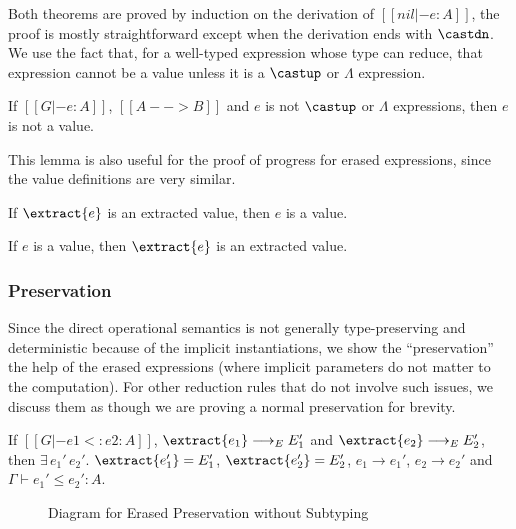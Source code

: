\noindent Both theorems are proved by induction on the derivation of $[[nil |- e : A]]$,
the proof is mostly straightforward except when the derivation ends with $\castdn$.
We use the fact that, for a well-typed expression whose type can reduce, that expression
cannot be a value unless it is a $\castup$ or $\Lambda$ expression.

\begin{lemma}
    If $[[G |- e : A]]$, $[[A --> B]]$ and $e$ is not $\castup$ or $\Lambda$ expressions,
    then $e$ is not a value.
\end{lemma}

This lemma is also useful for the proof of progress for erased expressions, since the
value definitions are very similar.

\begin{lemma}
    If $\extract{e}$ is an extracted value, then $e$ is a value.
\end{lemma}

\begin{lemma}
    If $e$ is a value, then $\extract{e}$ is an extracted value.
\end{lemma}


\subsubsection{Preservation}

Since the direct operational semantics is not generally type-preserving and
deterministic because of the implicit instantiations, we show the
``preservation'' the help of the erased expressions (where implicit parameters
do not matter to the computation). For other reduction rules that do not involve
such issues, we discuss them as though we are proving a normal preservation
for brevity.

\begin{theorem}
    If $[[G |- e1 <: e2 : A]]$, $\extract{e_1} \longrightarrow_E E_1'$ and $\extract{e_2} \longrightarrow_E E_2'$,
    then $\exists\,e_1' \, e_2'.$ $\extract{e_1'} = E_1'$, $\extract{e_2'} = E_2'$, $e_1 \longrightarrow e_1'$, $e_2 \longrightarrow e_2'$ and $\Gamma \vdash e_1' \le e_2' : A$.
\end{theorem}

\begin{figure}
    \centering
    \caption{Diagram for Erased Preservation without Subtyping}
    \label{fig:preservation}
\end{figure}


